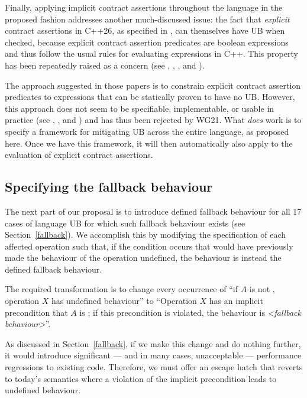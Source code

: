 Finally, applying implicit contract assertions throughout the language in the proposed fashion addresses another much-discussed issue: the fact that \emph{explicit} contract assertions in C++26, as specified in \cite{P2900R14}, can themselves have UB when checked, because explicit contract assertion predicates are boolean expressions and thus follow the usual rules for evaluating expressions in C++. This property has been repeatedly raised as a concern (see \cite{P2680R1}, \cite{P3173R0}, \cite{P3285R0}, and \cite{P3362R0}).

The approach suggested in those papers is to constrain explicit contract assertion predicates to expressions that can be statically proven to have no UB. However, this approach does not seem to be specifiable, implementable, or usable in practice (see  \cite{P3376R0}, \cite{P3386R0}, and \cite{P3499R1}) and has thus been rejected by WG21. What \emph{does} work is to specify a framework for mitigating UB across the entire language, as proposed here. Once we have this framework, it will then automatically also apply to the evaluation of explicit contract assertions.

\subsection{Specifying the fallback behaviour}
\label{specifyfallback}

The next part of our proposal is to introduce defined fallback behaviour for all 17 cases of language UB for which such fallback behaviour exists (see Section~\ref{fallback}). We accomplish this by modifying the specification of each affected operation such that, if the condition occurs that would have previously made the behaviour of the operation undefined, the behaviour is instead the defined fallback behaviour.

The required transformation is to change every occurrence of “if $A$ is not , operation $X$ has undefined behaviour'' to ``Operation $X$ has an implicit precondition that $A$ is ; if this precondition is violated, the behaviour is \emph{<fallback behaviour>}''.

As discussed in Section~\ref{fallback}, if we make this change and do nothing further, it would introduce significant --- and in many cases, unacceptable --- performance regressions to existing code. Therefore, we must offer an escape hatch that reverts to today's semantics where a violation of the implicit precondition leads to undefined behaviour.

